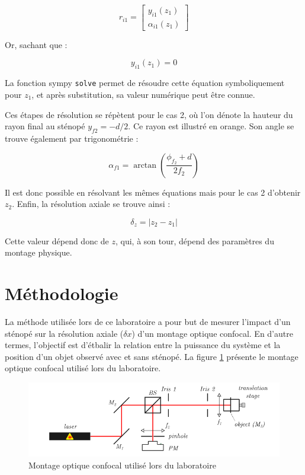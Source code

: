 \documentclass[11pt,letterpaper]{article}
\begin{document}
\begin{equation}
  r_{i1}= \begin{bmatrix}
   y_{i1}(z_{1})  \\
    \alpha_{i1}(z_{1})
  \end{bmatrix}
\end{equation}

Or, sachant que :

\begin{equation}
  y_{i1}(z_{1})=0
\end{equation}

La fonction sympy \texttt{solve} permet de résoudre cette équation symboliquement pour $z_{1}$, et après substitution, sa valeur numérique peut être connue.

Ces étapes de résolution se répètent pour le cas 2, où l'on dénote la hauteur du rayon final au sténopé $y_{f2} = -d/2$. Ce rayon est illustré en orange. Son angle se trouve également par trigonométrie :

\begin{equation}
  \alpha_{f1}= \arctan\left( \frac{\phi_{f_{2}}+d}{2f_{2}} \right)
\end{equation}

Il est donc possible en résolvant les mêmes équations mais pour le cas 2 d'obtenir $z_{2}$. Enfin, la résolution axiale se trouve ainsi :

\begin{equation}
  \delta_{z}= |z_{2}-z_{1}|
\end{equation}

Cette valeur dépend donc de $z$, qui, à son tour, dépend des paramètres du montage physique.

\section{Méthodologie}
La méthode utilisée lors de ce laboratoire a pour but de mesurer l'impact d'un sténopé sur la résolution axiale ($\delta x$) d'un montage optique confocal. En d'autre termes, l'objectif est d'étbalir la relation entre la puissance du système et la position d'un objet observé avec et sans sténopé. La figure \ref{montage} présente le montage optique confocal utilisé lors du laboratoire. 

\begin{figure}[H]
  \centering
  \includegraphics[scale=0.7]{Montage laboratoire 1.png}
  \caption{Montage optique confocal utilisé lors du laboratoire}
  \label{montage}
\end{figure}
\end{document}
